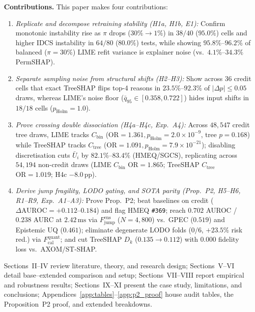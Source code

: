 \documentclass[conference]{IEEEtran}
\begin{document}
\textbf{Contributions.} This paper makes four contributions:
\begin{enumerate}\setlength{\itemsep}{0.5pt}\setlength{\parskip}{0pt}\setlength{\topsep}{1.5pt}
    \item \textit{Replicate and decompose retraining stability (H1a, H1b, E1):} Confirm monotonic instability rise as $\pi$ drops ($30\%{\to}1\%$) in $38/40$ ($95.0\%$) cells and higher IDCS instability in $64/80$ ($80.0\%$) tests, while showing $95.8\%$--$96.2\%$ of balanced ($\pi{=}30\%$) LIME refit variance is explainer noise (vs.\ $4.1\%$--$34.3\%$ PermSHAP).
    \item \textit{Separate sampling noise from structural shifts (H2--H3):} Show across 36 credit cells that exact TreeSHAP flips top-4 reasons in $23.5\%$--$92.3\%$ of $|\Delta p|\le 0.05$ draws, whereas LIME's noise floor ($\bar{q}_{95}\in[0.358,0.722]$) hides input shifts in $18/18$ cells ($p_{\mathrm{Holm}}{=}1.0$).
    \item \textit{Prove crossing double dissociation (H4a--H4c, Exp.~A4):} Across $48{,}547$ credit tree draws, LIME tracks $C_{\mathrm{bin}}$ ($\mathrm{OR}{=}1.361, p_{\mathrm{Holm}}{=}2.0{\times}10^{-9}$, tree $p{=}0.168$) while TreeSHAP tracks $C_{\mathrm{tree}}$ ($\mathrm{OR}{=}1.091, p_{\mathrm{Holm}}{=}7.9{\times}10^{-21}$); disabling discretisation cuts $\bar{U}_i$ by $82.1\%$--$83.4\%$ (HMEQ/SGCS), replicating across $54{,}194$ non-credit draws (LIME $C_{\mathrm{bin}}$ $\mathrm{OR}{=}1.865$; TreeSHAP $C_{\mathrm{tree}}$ $\mathrm{OR}{=}1.019$; H4c $-8.0\,\text{pp}$).
    \item \textit{Derive jump fragility, LODO gating, and SOTA parity (Prop.~P2, H5--H6, R1--R9, Exp.~A1--A3):} Prove Prop.~P2; beat baselines on credit ($\Delta\mathrm{AUROC}{=}{+}0.112$--$0.184$) and flag HMEQ \texttt{\#369}; reach $0.702$ AUROC / $0.238$ AURC at $2.42\,\text{ms}$ via $F_{\mathrm{jump}}^{\mathrm{ens}}$ ($N{=}4{,}800$) vs.\ GPEC ($0.519$) and Epistemic UQ ($0.461$); eliminate degenerate LODO folds ($0/6$, $+23.5\%$ risk red.) via $F_{\mathrm{cal}}^{\mathrm{quant}}$; and cut TreeSHAP $D_k$ ($0.135{\to}0.112$) with $0.000$ fidelity loss vs.\ AXOM/ST-SHAP.
\end{enumerate}

Sections~II--IV review literature, theory, and research design; Sections~V--VI detail base--extended comparison and setup; Sections~VII--VIII report empirical and robustness results; Sections~IX--XI present the case study, limitations, and conclusions; Appendices~\ref{app:tables}--\ref{app:p2_proof} house audit tables, the Proposition~P2 proof, and extended breakdowns.
\end{document}

